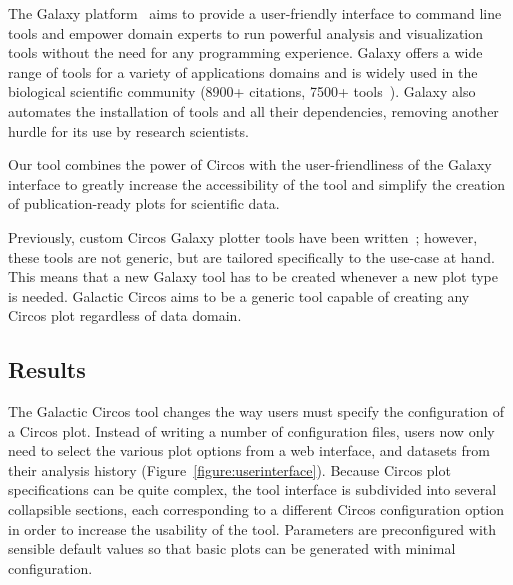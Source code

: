 The Galaxy platform~\cite{afgan2018galaxy} aims to provide a user-friendly interface to command line tools and empower domain experts to run powerful analysis and visualization tools without the need for any programming experience. Galaxy offers a wide range of tools for a variety of applications domains and is widely used in the biological scientific community (8900+ citations, 7500+ tools~\cite{galaxycitations,galaxytoolshed}). Galaxy also automates the installation of tools and all their dependencies, removing another hurdle for its use by research scientists.

Our tool combines the power of Circos with the user-friendliness of the Galaxy interface to greatly increase the accessibility of the tool and simplify the creation of publication-ready plots for scientific data.

Previously, custom Circos Galaxy plotter tools have been written~\cite{hiltemann2014cgtag}; however, these tools are not generic, but are tailored specifically to the use-case at hand. This means that a new Galaxy tool has to be created whenever a new plot type is needed. Galactic Circos aims to be a generic tool capable of creating any Circos plot regardless of data domain.

\subsection*{Results}
The Galactic Circos tool changes the way users must specify the configuration of a Circos plot. Instead of writing a number of configuration files, users now only need to select the various plot options from a web interface, and datasets from their analysis history (Figure~\ref{figure:userinterface}). Because Circos plot specifications can be quite complex, the tool interface is subdivided into several collapsible sections, each corresponding to a different Circos configuration option in order to increase the usability of the tool. Parameters are preconfigured with sensible default values so that basic plots can be generated with minimal configuration.

